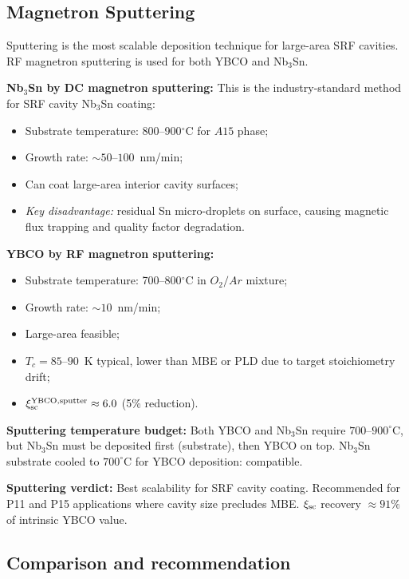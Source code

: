 \documentclass[11pt]{article}
\begin{document}
\subsection{Magnetron Sputtering}

Sputtering is the most scalable deposition technique for large-area SRF
cavities. RF magnetron sputtering is used for both YBCO and Nb$_3$Sn.

\textbf{Nb$_3$Sn by DC magnetron sputtering:} This is the industry-standard
method for SRF cavity Nb$_3$Sn coating:
\begin{itemize}
  \item Substrate temperature: 800--900$^\circ$C for $A15$ phase;
  \item Growth rate: $\sim 50$--$100$~nm/min;
  \item Can coat large-area interior cavity surfaces;
  \item \emph{Key disadvantage:} residual Sn micro-droplets on surface,
        causing magnetic flux trapping and quality factor degradation.
\end{itemize}

\textbf{YBCO by RF magnetron sputtering:}
\begin{itemize}
  \item Substrate temperature: 700--800$^\circ$C in $O_2/Ar$ mixture;
  \item Growth rate: $\sim 10$~nm/min;
  \item Large-area feasible;
  \item $T_c = 85$--$90$~K typical, lower than MBE or PLD due to
        target stoichiometry drift;
  \item $\xi_{\rm sc}^{\rm YBCO,sputter} \approx 6.0$ (5\% reduction).
\end{itemize}

\textbf{Sputtering temperature budget:} Both YBCO and Nb$_3$Sn require
$700$--$900^\circ$C, but Nb$_3$Sn must be deposited first (substrate),
then YBCO on top. Nb$_3$Sn substrate cooled to $700^\circ$C for YBCO
deposition: compatible.

\textbf{Sputtering verdict:} Best scalability for SRF cavity coating.
Recommended for P11 and P15 applications where cavity size precludes MBE.
$\xi_{\rm sc}$ recovery $\approx 91\%$ of intrinsic YBCO value.

\subsection{Comparison and recommendation}
\end{document}
